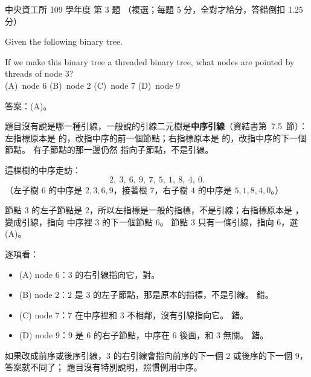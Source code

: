 \begin{pastexam}[label={px:ncu-109-dsa-03}]{中央資工所 109 學年度 第 3 題}
（複選；每題 5 分，全對才給分，答錯倒扣 1.25 分）

Given the following binary tree.

\begin{center}
\end{center}

If we make this binary tree a threaded binary tree, what nodes are pointed by threads of node 3?\\
(A)~node 6 \qquad (B)~node 2 \qquad (C)~node 7 \qquad (D)~node 9
\end{pastexam}

\begin{pastsoln}
答案：(A)。

題目沒有說是哪一種引線，一般說的引線二元樹是\textbf{中序引線}（資結書第~7.5~節）：左指標原本是
\NIL 的，改指中序的前一個節點；右指標原本是 \NIL 的，改指中序的下一個節點。 有子節點的那一邊仍然
指向子節點，不是引線。

這棵樹的中序走訪：
\[
2,\ 3,\ 6,\ 9,\ 7,\ 5,\ 1,\ 8,\ 4,\ 0.
\]
（左子樹 $6$ 的中序是 $2, 3, 6, 9$，接著根 $7$，右子樹 $4$ 的中序是 $5, 1, 8, 4, 0$。）

節點 $3$ 的左子節點是 $2$，所以左指標是一般的指標，不是引線；右指標原本是 \NIL，變成引線，指向
中序裡 $3$ 的下一個節點 $6$。 節點 $3$ 只有一條引線，指向 $6$，選 (A)。

逐項看：
\begin{itemize}
\item (A) node 6：$3$ 的右引線指向它，對。
\item (B) node 2：$2$ 是 $3$ 的左子節點，那是原本的指標，不是引線。 錯。
\item (C) node 7：$7$ 在中序裡和 $3$ 不相鄰，沒有引線指向它。 錯。
\item (D) node 9：$9$ 是 $6$ 的右子節點，中序在 $6$ 後面，和 $3$ 無關。 錯。
\end{itemize}
如果改成前序或後序引線，$3$ 的右引線會指向前序的下一個 $2$ 或後序的下一個 $9$，答案就不同了；
題目沒有特別說明，照慣例用中序。
\end{pastsoln}
